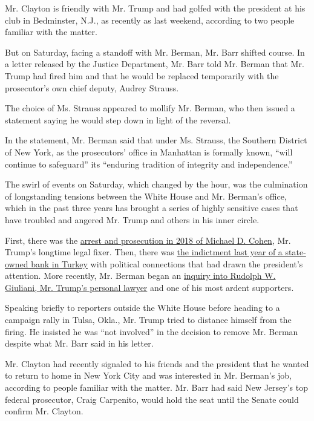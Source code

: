 Mr. Clayton is friendly with Mr. Trump and had golfed with the president
at his club in Bedminster, N.J., as recently as last weekend, according
to two people familiar with the matter.

But on Saturday, facing a standoff with Mr. Berman, Mr. Barr shifted
course. In a letter released by the Justice Department, Mr. Barr told
Mr. Berman that Mr. Trump had fired him and that he would be replaced
temporarily with the prosecutor's own chief deputy, Audrey Strauss.

The choice of Ms. Strauss appeared to mollify Mr. Berman, who then
issued a statement saying he would step down in light of the reversal.

In the statement, Mr. Berman said that under Ms. Strauss, the Southern
District of New York, as the prosecutors' office in Manhattan is
formally known, ``will continue to safeguard'' its ``enduring tradition
of integrity and independence.''

The swirl of events on Saturday, which changed by the hour, was the
culmination of longstanding tensions between the White House and Mr.
Berman's office, which in the past three years has brought a series of
highly sensitive cases that have troubled and angered Mr. Trump and
others in his inner circle.

First, there was the
\href{https://www.nytimes.com/2018/08/21/nyregion/michael-cohen-plea-deal-trump.html}{arrest
and prosecution in 2018 of Michael D. Cohen}, Mr. Trump's longtime legal
fixer. Then, there was
\href{https://www.nytimes.com/2019/10/16/us/politics/halkbank-trump-turkey.html}{the
indictment last year of a state-owned bank in Turkey} with political
connections that had drawn the president's attention. More recently, Mr.
Berman began an
\href{https://www.nytimes.com/2019/10/11/us/politics/rudy-giuliani-investigation.html}{inquiry
into Rudolph W. Giuliani, Mr. Trump's personal lawyer} and one of his
most ardent supporters.

Speaking briefly to reporters outside the White House before heading to
a campaign rally in Tulsa, Okla., Mr. Trump tried to distance himself
from the firing. He insisted he was ``not involved'' in the decision to
remove Mr. Berman despite what Mr. Barr said in his letter.

Mr. Clayton had recently signaled to his friends and the president that
he wanted to return to home in New York City and was interested in Mr.
Berman's job, according to people familiar with the matter. Mr. Barr had
said New Jersey's top federal prosecutor, Craig Carpenito, would hold
the seat until the Senate could confirm Mr. Clayton.

